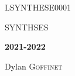 \documentclass{report}
\begin{document}

\begin{titlepage}
	\centering
	{\scshape\LARGE LSYNTHESE0001 \par}
	\vspace{1cm}
	{\scshape\Large SYNTHSES \par}
	\vspace{1.5cm}
	{\huge\bfseries 2021-2022\par}
	\vspace{2cm}
	{\Large\itshape\par}
	\vfill
	\vfill
	Dylan \textsc{Goffinet}\par
	{\large \par}
\end{titlepage}


\setcounter{tocdepth}{1} %
\tableofcontents
\clearpage




\end{document}
